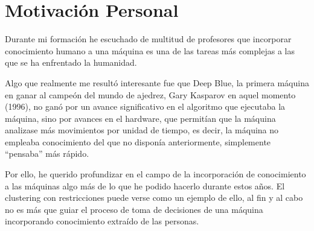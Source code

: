 %

\section{Motivación Personal}

Durante mi formación he escuchado de multitud de profesores que incorporar conocimiento humano a una máquina es una de las tareas más complejas a las que se ha enfrentado la humanidad.

Algo que realmente me resultó interesante fue que Deep Blue, la primera máquina en ganar al campeón del mundo de ajedrez, Gary Kasparov en aquel momento (1996), no ganó por un avance significativo en el algoritmo que ejecutaba la máquina, sino por avances en el hardware, que permitían que la máquina analizase más movimientos por unidad de tiempo, es decir, la máquina no empleaba conocimiento del que no disponía anteriormente, simplemente ``pensaba'' más rápido.

Por ello, he querido profundizar en el campo de la incorporación de conocimiento a las máquinas algo más de lo que he podido hacerlo durante estos años. El clustering con restricciones puede verse como un ejemplo de ello, al fin y al cabo no es más que guiar el proceso de toma de decisiones de una máquina incorporando conocimiento extraído de las personas.
